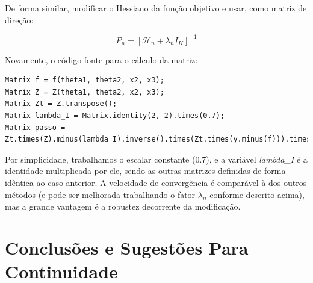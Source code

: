 \documentclass{abnt}
\newenvironment{mylisting}
{\begin{list}{}{\setlength{\leftmargin}{1em}}\item\scriptsize\bfseries}
{\end{list}}
\begin{document}
De forma similar, modificar o Hessiano da função objetivo e usar, como matriz de direção:

\[ P_n = [\mathcal{H}_n+\lambda_nI_K]^{-1} \]

Novamente, o código-fonte para o cálculo da matriz:

\begin{mylisting}
\begin{verbatim}
Matrix f = f(theta1, theta2, x2, x3); 
Matrix Z = Z(theta1, theta2, x2, x3); 
Matrix Zt = Z.transpose(); 
Matrix lambda_I = Matrix.identity(2, 2).times(0.7); 
Matrix passo = Zt.times(Z).minus(lambda_I).inverse().times(Zt.times(y.minus(f))).times(-1);
\end{verbatim}
\end{mylisting}

Por simplicidade, trabalhamos o escalar constante (0.7), e a variável \textit{lambda\_I} é a identidade multiplicada por ele, sendo as outras matrizes definidas de forma idêntica ao caso anterior. A velocidade de convergência é comparável à dos outros métodos (e pode ser melhorada trabalhando o fator $\lambda_n$ conforme descrito acima), mas a grande vantagem é a robustez decorrente da modificação.

\chapter {Conclusões e Sugestões Para Continuidade}



\end{document}
